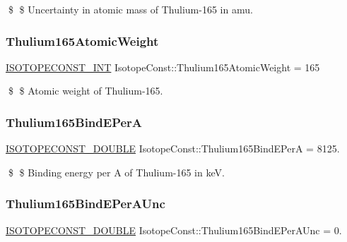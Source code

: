 \$ \$ Uncertainty in atomic mass of Thulium-\/165 in amu. \mbox{\label{group___isotope_const-_thulium-_tm165_ga341474512ffa8ecc940491d9fc982825}} 
\subsubsection{\texorpdfstring{Thulium165\+Atomic\+Weight}{Thulium165AtomicWeight}}
{\footnotesize\ttfamily \mbox{\hyperlink{group___isotope_const-_macros_ga5f18360b3e99483a35c32d789e62621c}{I\+S\+O\+T\+O\+P\+E\+C\+O\+N\+S\+T\+\_\+\+I\+NT}} Isotope\+Const\+::\+Thulium165\+Atomic\+Weight = 165}

\$ \$ Atomic weight of Thulium-\/165. \mbox{\label{group___isotope_const-_thulium-_tm165_ga4d3e2ec8f20f646f0b15ada5ecb2e61d}} 
\subsubsection{\texorpdfstring{Thulium165\+Bind\+E\+PerA}{Thulium165BindEPerA}}
{\footnotesize\ttfamily \mbox{\hyperlink{group___isotope_const-_macros_ga8f45a7272ce02c0b4c65c44636ed719a}{I\+S\+O\+T\+O\+P\+E\+C\+O\+N\+S\+T\+\_\+\+D\+O\+U\+B\+LE}} Isotope\+Const\+::\+Thulium165\+Bind\+E\+PerA = 8125.}

\$ \$ Binding energy per A of Thulium-\/165 in keV. \mbox{\label{group___isotope_const-_thulium-_tm165_ga1f9777aa6637fdf54f400da4410bf72d}} 
\subsubsection{\texorpdfstring{Thulium165\+Bind\+E\+Per\+A\+Unc}{Thulium165BindEPerAUnc}}
{\footnotesize\ttfamily \mbox{\hyperlink{group___isotope_const-_macros_ga8f45a7272ce02c0b4c65c44636ed719a}{I\+S\+O\+T\+O\+P\+E\+C\+O\+N\+S\+T\+\_\+\+D\+O\+U\+B\+LE}} Isotope\+Const\+::\+Thulium165\+Bind\+E\+Per\+A\+Unc = 0.}

